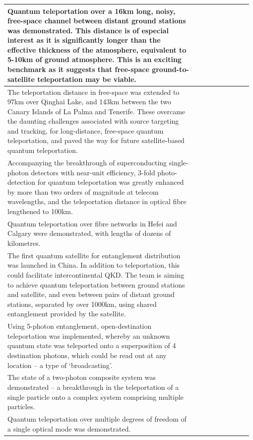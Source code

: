 \documentclass[aps, rmp, twocolumn, amsmath, amssymb, nofootinbib, superscriptaddress, longbibliography, floatfix, table-of-contents, eqsecnum]{revtex4-1}
\begin{document}
\begin{table}[!htb]
\begin{tabular}{|p{0.755\linewidth}|p{0.22\linewidth}|}
	\hline
	Quantum teleportation over a 16km long, noisy, free-space channel between distant ground stations was demonstrated. This distance is of especial interest as it is significantly longer than the effective thickness of the atmosphere, equivalent to 5-10km of ground atmosphere. This is an exciting benchmark as it suggests that free-space ground-to-satellite teleportation may be viable. & \cite{bib:Nat_Phot_4_376, bib:PRL_94_150501} \\
	\hline
	The teleportation distance in free-space was extended to 97km over Qinghai Lake, and 143km between the two Canary Islands of La Palma and Tenerife. These overcame the daunting challenges associated with source targeting and tracking, for long-distance, free-space quantum teleportation, and paved the way for future satellite-based quantum teleportation. & \cite{bib:Nat_488_185, bib:Nat_489_269} \\
	\hline
	Accompanying the breakthrough of superconducting single-photon detectors with near-unit efficiency, 3-fold photo-detection for quantum teleportation was greatly enhanced by more than two orders of magnitude at telecom wavelengths, and the teleportation distance in optical fibre lengthened to 100km. & \cite{bib:Optica_2_832} \\
	\hline
	Quantum teleportation over fibre networks in Hefei and Calgary were demonstrated, with lengths of dozens of kilometres. & \cite{bib:Nat_Phot_10_671, bib:Nat_Phot_10_676} \\
	\hline
	The first quantum satellite for entanglement distribution was launched in China. In addition to teleportation, this could facilitate intercontinental QKD. The team is aiming to achieve quantum teleportation between ground stations and satellite, and even between pairs of distant ground stations, separated by over 1000km, using shared entanglement provided by the satellite. & \cite{bib:Nat_535_478} \\
	\hline
	Using 5-photon entanglement, open-destination teleportation was implemented, whereby an unknown quantum state was teleported onto a superposition of 4 destination photons, which could be read out at any location -- a type of `broadcasting'. & \cite{bib:Nat_430_54} \\
	\hline
	The state of a two-photon composite system was demonstrated -- a breakthrough in the teleportation of a single particle onto a complex system comprising multiple particles. & \cite{bib:Nat_Phys_2_678} \\
	\hline
	Quantum teleportation over multiple degrees of freedom of a single optical mode was demonstrated. & \cite{bib:Nat_518_516} \\

\end{tabular}
\end{table}
\end{document}
